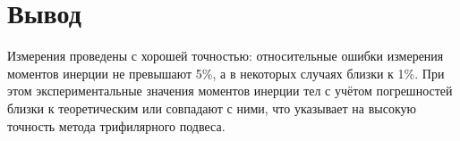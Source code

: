 \section{Вывод}

Измерения проведены с хорошей точностью: относительные ошибки измерения моментов инерции не превышают 5\%, а в некоторых случаях близки к 1\%. При этом экспериментальные значения моментов инерции тел с учётом погрешностей близки к теоретическим или совпадают с ними, что указывает на высокую точность метода трифилярного подвеса.